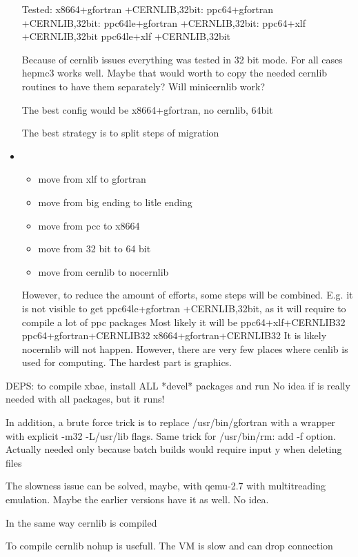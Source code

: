 \documentclass[a4paper,10pt]{article}
\begin{document}
\begin{itemize}
{\begin{itemize}
\end{itemize}
}
Tested:
x8664+gfortran +CERNLIB,32bit:  
ppc64+gfortran +CERNLIB,32bit:  
ppc64le+gfortran +CERNLIB,32bit:  
ppc64+xlf +CERNLIB,32bit
ppc64le+xlf +CERNLIB,32bit

Because of cernlib issues everything was tested in 32 bit mode.
For all cases hepmc3 works well.
Maybe that would worth to copy the needed cernlib routines to have them separately?
Will minicernlib work?

The best config would be 
x8664+gfortran, no cernlib, 64bit

The best strategy is to split steps of migration
\item {
\begin{itemize}
\item move from  xlf to gfortran
\item move from  big ending to litle ending
\item move from  pcc to x8664
\item move from 32 bit to 64 bit
\item move from cernlib to nocernlib
\end{itemize}
}
However, to reduce the amount of efforts, some steps will be combined.
E.g. it is not visible to get ppc64le+gfortran +CERNLIB,32bit, as it will require to compile a lot of ppc packages
Most likely it will be 
ppc64+xlf+CERNLIB32
ppc64+gfortran+CERNLIB32
x8664+gfortran+CERNLIB32
It is likely nocernlib will not happen.
However, there are very few places where cenlib is used for computing.
The hardest part is graphics.
\end{itemize}

DEPS:
to compile xbae, install ALL *devel* packages and run
No idea if %
is really needed with all packages, but it runs!

In addition, a brute force trick is to replace /usr/bin/gfortran with a wrapper with explicit -m32 -L/usr/lib flags.
Same trick for /usr/bin/rm:   add -f option.
Actually needed only because batch builds would require input y when deleting files

The slowness issue can be solved, maybe, with qemu-2.7 with multitreading emulation.
Maybe the earlier versions have it as well. No idea.


In the same way cernlib is compiled

To compile cernlib nohup is usefull. The VM is slow and can drop connection
\end{document}

